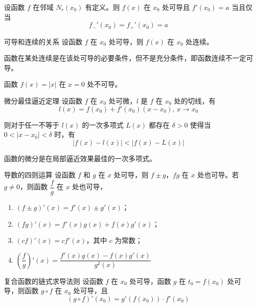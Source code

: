 \begin{proposition}
    设函数 $f$ 在邻域 $N_r(x_0)$ 有定义。则 $f(x)$ 在 $x_0$ 处可导且 $f'(x_0) = a$ 当且仅当
    \[f_{-}'(x_0) = f_{+}'(x_0) = a\]
\end{proposition}

\begin{theorem}{可导和连续的关系}
    设函数 $f$ 在 $x_0$ 处可导，则 $f(x)$ 在 $x_0$ 处连续。
\end{theorem}
\begin{remark}
    函数在某处连续是在该处可导的必要条件，但不是充分条件，即函数连续不一定可导。
\end{remark}

\hfill

\begin{example}
    函数 $f(x) = |x|$ 在 $x = 0$ 处不可导。
\end{example}

\hfill

\begin{theorem}{微分最佳逼近定理}
    设函数 $f$ 在 $x_0$ 处可微，$l$ 是 $f$ 在 $x_0$ 处的切线，有
    \[l(x) = f(x_0) + f'(x_0)(x - x_0),\, x\to x_0\]

    则对于任一不等于 $l(x)$ 的一次多项式 $L(x)$ 都存在 $\delta > 0$ 使得当 $0 < |x - x_0| < \delta$ 时，有
    \[|f(x) - l(x)| < |f(x) - L(x)|\]
\end{theorem}
函数的微分是在局部逼近效果最佳的一次多项式。

\begin{theorem}{导数的四则运算}
    设函数 $f$ 和 $g$ 在 $x$ 处可导，则 $f \pm g$，$fg$ 在 $x$ 处也可导。若 $g \ne 0$，则函数 $\dfrac{f}{g}$ 在 $x$ 处也可导，
    \begin{enumerate}
        \item $(f \pm g)'(x) = f'(x) \pm g'(x)$；
        \item $(fg)'(x) = f'(x)g(x) + f(x)g'(x)$；
        \item $(cf)'(x) = cf'(x)$，其中 $c$ 为常数；
        \item $\left(\dfrac{f}{g}\right)'(x) = \dfrac{f'(x)g(x) - f(x)g'(x)}{g^2(x)}$
    \end{enumerate}
\end{theorem}

\begin{theorem}{复合函数的链式求导法则}
    设函数 $f$ 在 $x_0$ 处可导，函数 $g$ 在 $t_0 = f(x_0)$ 处可导，则函数 $g \circ f$ 在 $x_0$ 处可导，且
    \[(g \circ f)'(x_0) = g'(f(x_0)) \cdot f'(x_0)\]
\end{theorem}

